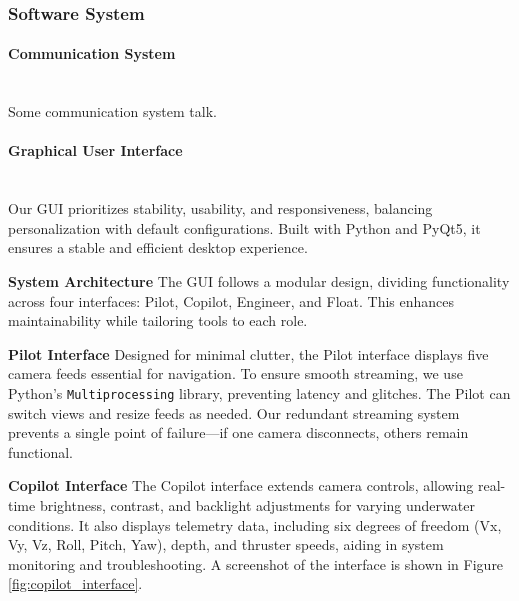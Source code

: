 \subsubsection{Software System}

\paragraph{Communication System} \ \\
\vspace{-0.5cm}
Some communication system talk.


\paragraph{Graphical User Interface} \ \\
Our GUI prioritizes stability, usability, and responsiveness, balancing personalization with default configurations. Built with Python and PyQt5, it ensures a stable and efficient desktop experience.

\vspace{0.2cm}
\textbf{System Architecture}
The GUI follows a modular design, dividing functionality across four interfaces: Pilot, Copilot, Engineer, and Float. This enhances maintainability while tailoring tools to each role.

\vspace{0.2cm}
\textbf{Pilot Interface}
Designed for minimal clutter, the Pilot interface displays five camera feeds essential for navigation. To ensure smooth streaming, we use Python's \texttt{Multiprocessing} library, preventing latency and glitches. The Pilot can switch views and resize feeds as needed. Our redundant streaming system prevents a single point of failure—if one camera disconnects, others remain functional. 

\vspace{0.2cm}
\textbf{Copilot Interface}
The Copilot interface extends camera controls, allowing real-time brightness, contrast, and backlight adjustments for varying underwater conditions. It also displays telemetry data, including six degrees of freedom (Vx, Vy, Vz, Roll, Pitch, Yaw), depth, and thruster speeds, aiding in system monitoring and troubleshooting. A screenshot of the interface is shown in Figure \ref{fig:copilot_interface}.


